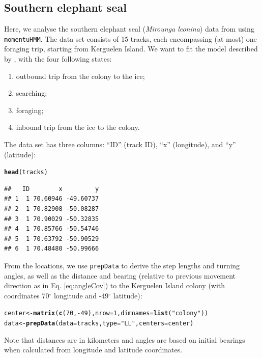 \documentclass[12pt]{article}\usepackage[]{graphicx}\usepackage[]{color}
\makeatletter
\newcommand{\hlnum}[1]{\textcolor[rgb]{0.686,0.059,0.569}{#1}}%
\newcommand{\hlstr}[1]{\textcolor[rgb]{0.192,0.494,0.8}{#1}}%
\newcommand{\hlopt}[1]{\textcolor[rgb]{0,0,0}{#1}}%
\newcommand{\hlstd}[1]{\textcolor[rgb]{0.345,0.345,0.345}{#1}}%
\newcommand{\hlkwb}[1]{\textcolor[rgb]{0.69,0.353,0.396}{#1}}%
\newcommand{\hlkwc}[1]{\textcolor[rgb]{0.333,0.667,0.333}{#1}}%
\newcommand{\hlkwd}[1]{\textcolor[rgb]{0.737,0.353,0.396}{\textbf{#1}}}%
\newenvironment{kframe}{%
 \def\at@end@of@kframe{}%
 \ifinner\ifhmode%
  \def\at@end@of@kframe{\end{minipage}}%
  \begin{minipage}{\columnwidth}%
 \fi\fi%
 \def\FrameCommand##1{\hskip\@totalleftmargin \hskip-\fboxsep
 \colorbox{shadecolor}{##1}\hskip-\fboxsep
     \hskip-\linewidth \hskip-\@totalleftmargin \hskip\columnwidth}%
 \MakeFramed {\advance\hsize-\width
   \@totalleftmargin\z@ \linewidth\hsize
   \@setminipage}}%
 {\par\unskip\endMakeFramed%
 \at@end@of@kframe}
\newenvironment{knitrout}{}{} %
\makeatother
\begin{document}
\subsection{Southern elephant seal}
Here, we analyse the southern elephant seal (\emph{Mirounga leonina}) data from \cite{MichelotEtAl2017} using \verb|momentuHMM|. The data set consists of 15 tracks, each encompassing (at most) one foraging trip, starting from Kerguelen Island. We want to fit the model described by \cite{MichelotEtAl2017}, with the four following states:
\begin{enumerate}
\item outbound trip from the colony to the ice;
\item searching;
\item foraging;
\item inbound trip from the ice to the colony.
\end{enumerate}

The data set has three columns: ``ID'' (track ID), ``x'' (longitude), and ``y'' (latitude):

\begin{knitrout}
\color{fgcolor}\begin{kframe}
\begin{alltt}
\hlkwd{head}\hlstd{(tracks)}
\end{alltt}
\begin{verbatim}
##   ID        x         y
## 1  1 70.60946 -49.60737
## 2  1 70.82908 -50.08287
## 3  1 70.90029 -50.32835
## 4  1 70.85766 -50.54746
## 5  1 70.63792 -50.90529
## 6  1 70.48480 -50.99666
\end{verbatim}
\end{kframe}
\end{knitrout}

From the locations, we use \verb|prepData| to derive the step lengths and turning angles, as well as the distance and bearing (relative to previous movement direction as in Eq. \ref{eq:angleCov}) to the Kerguelen Island colony (with coordinates 70$^{\circ}$ longitude and -49$^{\circ}$ latitude):
\begin{knitrout}
\color{fgcolor}\begin{kframe}
\begin{alltt}
\hlstd{center} \hlkwb{<-} \hlkwd{matrix}\hlstd{(}\hlkwd{c}\hlstd{(}\hlnum{70}\hlstd{,}\hlopt{-}\hlnum{49}\hlstd{),}\hlkwc{nrow}\hlstd{=}\hlnum{1}\hlstd{,}\hlkwc{dimnames}\hlstd{=}\hlkwd{list}\hlstd{(}\hlstr{"colony"}\hlstd{))}
\hlstd{data} \hlkwb{<-} \hlkwd{prepData}\hlstd{(}\hlkwc{data}\hlstd{=tracks,} \hlkwc{type}\hlstd{=}\hlstr{"LL"}\hlstd{,} \hlkwc{centers}\hlstd{=center)}
\end{alltt}
\end{kframe}
\end{knitrout}
Note that distances are in kilometers and angles are based on initial bearings \citep[using geosphere::bearing;][]{Hijmans2016geo} when calculated from longitude and latitude coordinates.  
\end{document}
